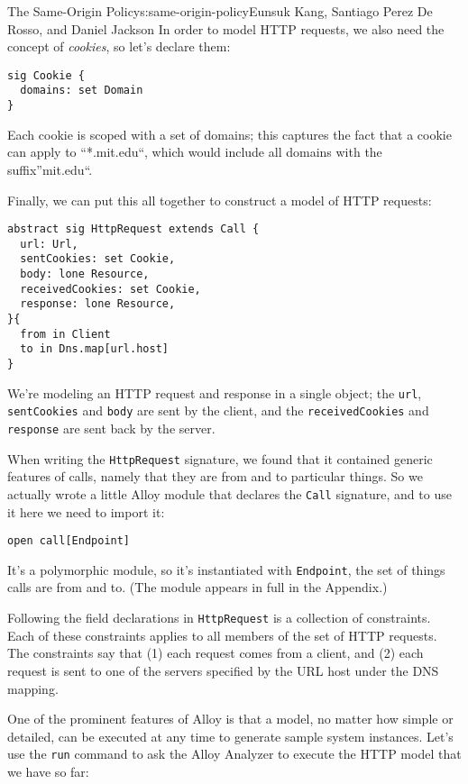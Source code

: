 \begin{aosachapter}{The Same-Origin Policy}{s:same-origin-policy}{Eunsuk Kang, Santiago Perez De Rosso, and Daniel Jackson}
In order to model HTTP requests, we also need the concept of
\emph{cookies}, so let's declare them:

\begin{verbatim}
sig Cookie {
  domains: set Domain
}
\end{verbatim}

Each cookie is scoped with a set of domains; this captures the fact that
a cookie can apply to ``*.mit.edu``, which would include all domains
with the suffix''mit.edu``.

Finally, we can put this all together to construct a model of HTTP
requests:

\begin{verbatim}
abstract sig HttpRequest extends Call {
  url: Url,
  sentCookies: set Cookie,
  body: lone Resource,
  receivedCookies: set Cookie,
  response: lone Resource,
}{
  from in Client
  to in Dns.map[url.host]
}
\end{verbatim}

We're modeling an HTTP request and response in a single object; the
\texttt{url}, \texttt{sentCookies} and \texttt{body} are sent by the
client, and the \texttt{receivedCookies} and \texttt{response} are sent
back by the server.

When writing the \texttt{HttpRequest} signature, we found that it
contained generic features of calls, namely that they are from and to
particular things. So we actually wrote a little Alloy module that
declares the \texttt{Call} signature, and to use it here we need to
import it:

\begin{verbatim}
open call[Endpoint]
\end{verbatim}

It's a polymorphic module, so it's instantiated with \texttt{Endpoint},
the set of things calls are from and to. (The module appears in full in
the Appendix.)

Following the field declarations in \texttt{HttpRequest} is a collection
of constraints. Each of these constraints applies to all members of the
set of HTTP requests. The constraints say that (1) each request comes
from a client, and (2) each request is sent to one of the servers
specified by the URL host under the DNS mapping.

One of the prominent features of Alloy is that a model, no matter how
simple or detailed, can be executed at any time to generate sample
system instances. Let's use the \texttt{run} command to ask the Alloy
Analyzer to execute the HTTP model that we have so far:


\end{aosachapter}
